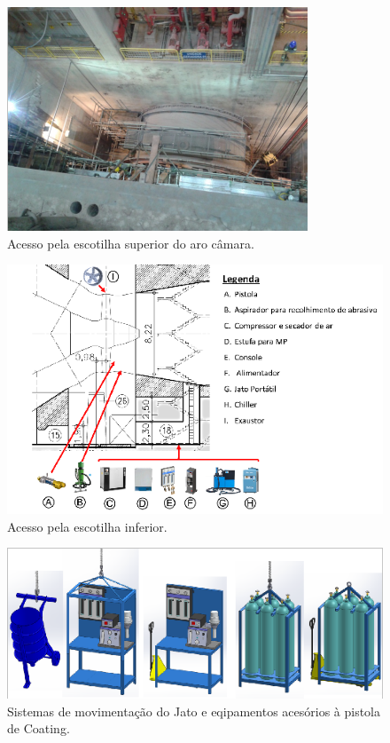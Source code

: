 \begin{figure}
	\centering
	\includegraphics[width=0.7\columnwidth]{sota/figs/projeto/proj_hvof_2.png}
    \caption{Acesso pela escotilha superior do aro câmara.}
    \label{fig:proj_hvof_2}
\end{figure}

\begin{figure}
	\centering
	\includegraphics[width=0.9\columnwidth]{sota/figs/projeto/proj_hvof_3.png}
    \caption{Acesso pela escotilha inferior.}
    \label{fig:proj_hvof_3}
\end{figure}

\begin{figure}
	\centering
	\includegraphics[width=0.7\columnwidth]{sota/figs/projeto/proj_hvof_4.png}
    \caption{Sistemas de movimentação do Jato e eqipamentos acesórios à pistola de Coating.}
    \label{fig:proj_hvof_4}
\end{figure}

